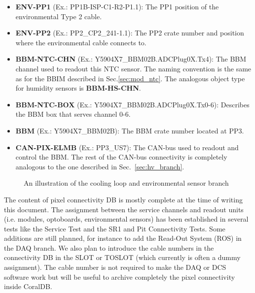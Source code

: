 \begin{itemize}
\item {\bf ENV-PP1} (Ex.: PP1B-ISP-C1-R2-P1.1): The PP1 position of the environmental Type 2 cable.
\item {\bf ENV-PP2} (Ex.: PP2\_CP2\_241-1.1): The PP2 crate number and position where the 
environmental cable connects to.
\item {\bf BBM-NTC-CHN} (Ex.: Y5904X7\_BBM02B.ADCPlug0X.Tx4): The BBM channel used to readout
this NTC sensor. The naming convention is the same as for the BBIM described in 
Sec.\ref{sec:mod_ntc}. The analogous object type for humidity sensors is {\bf BBM-HS-CHN}.
\item {\bf BBM-NTC-BOX} (Ex.: Y5904X7\_BBM02B.ADCPlug0X.Tx0-6): Describes the BBM box that serves channel 0-6.
\item {\bf BBM} (Ex.: Y5904X7\_BBM02B): The BBM crate number located at PP3.
\item {\bf CAN-PIX-ELMB} (Ex.: PP3\_US7): The CAN-bus used to readout and control the BBM. The rest of the 
CAN-bus connectivity is completely analogous to the one described in Sec.~\ref{sec:hv_branch}.
\end{itemize}

\begin{figure}
\begin{center}
\end{center}
\caption{An illustration of the cooling loop and environmental sensor branch}
\label{fig:branch_env}
\end{figure}

The content of pixel connectivity DB is mostly complete at the time
of writing this document. The assignment between the service channels and readout units
(i.e. modules, optoboards, environmental sensors) has been established in several tests like the 
Service Test \cite{service_test} and the SR1 \cite{sr1_ct} and Pit Connectivity Tests.
Some additions are still planned, for instance to add the Read-Out System (ROS) in the DAQ 
branch. We also plan to introduce the cable numbers in the connectivity DB
in the SLOT or TOSLOT (which currently is often a dummy assignment). The cable number is not
required to make the DAQ or DCS software work but will be useful to archive completely 
the pixel connectivity inside CoralDB.

